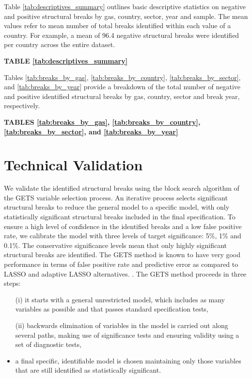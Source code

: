 \documentclass[a4paper]{article}
\begin{document}
Table \ref{tab:descriptives_summary} outlines basic descriptive statistics on negative and positive structural breaks by gas, country, sector, year and sample. The mean values refer to mean number of total breaks identified within each value of a country. For example, a mean of 96.4 negative structural breaks were identified per country across the entire dataset.

\bigskip
\begin{center}
    \textbf{TABLE \ref{tab:descriptives_summary}}
\end{center}

Tables \ref{tab:breaks_by_gas}, \ref{tab:breaks_by_country}, \ref{tab:breaks_by_sector}, and \ref{tab:breaks_by_year} provide a breakdown of the total number of negative and positive identified structural breaks by gas, country, sector and break year, respectively.

\bigskip
\begin{center}
    \textbf{TABLES \ref{tab:breaks_by_gas}, \ref{tab:breaks_by_country}, \ref{tab:breaks_by_sector}, and \ref{tab:breaks_by_year}}
\end{center}



\section*{Technical Validation}

We validate the identified structural breaks using the block search algorithm of the GETS variable selection process. An iterative process selects significant structural breaks to reduce the general model to a specific model, with only statistically significant structural breaks included in the final specification. To ensure a high level of confidence in the identified breaks and a low false positive rate, we calibrate the model with three levels of target significance: 5\%, 1\% and 0.1\%. The conservative significance levels mean that only highly significant structural breaks are identified. The GETS method is known to have very good performance in terms of false positive rate and predictive error as compared to LASSO and adaptive LASSO alternatives. \cite{pretis2018automated}. The GETS method proceeds in three steps: 
\begin{itemize}
    \item[(i)] it starts with a general unrestricted model, which includes as many variables as possible and that passes standard specification tests,
    \item[(ii)] backwards elimination of variables in the model is carried out along several paths, making use of significance tests and ensuring validity using a set of diagnostic tests,
    \item a final specific, identifiable model is chosen maintaining only those variables that are still identified as statistically significant.
\end{itemize}  
\end{document}
